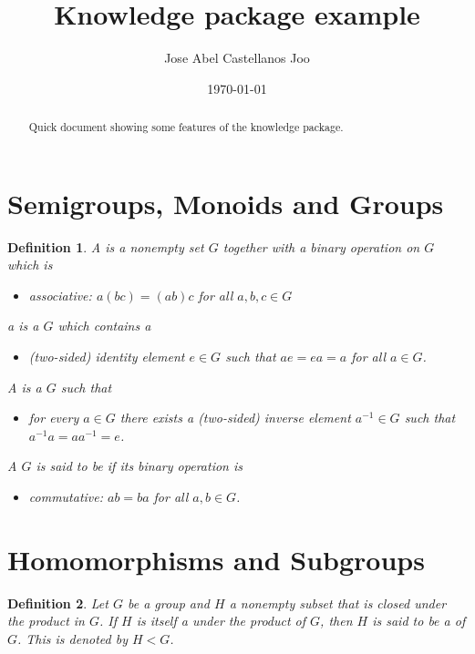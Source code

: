 \documentclass[a4paper]{article}
\title{Knowledge package example}
\author{Jose Abel Castellanos Joo}
\date{\today}
\newtheorem{definition}{Definition}[section]
\begin{document}
\maketitle

\begin{abstract}
  Quick document showing some features of the knowledge package.
\end{abstract}

\section{Semigroups, Monoids and Groups} \cite{Hungerford1980}

\begin{definition}
  A  is a nonempty set $G$ together
  with a binary operation on $G$ which is
  \begin{itemize}
    \item associative: $a(bc) = (ab)c$ for all $a, b, c \in G$
  \end{itemize}

  a  is a  $G$ which contains a 
  \begin{itemize}
    \item (two-sided) identity element $e \in G$ such that $ae = ea = a$ for all $a \in G$.
  \end{itemize}

  A  is a  $G$ such that

  \begin{itemize}
    \item for every $a \in G$ there exists a (two-sided) inverse element $a^{-1} \in G$
      such that $a^{-1}a = aa^{-1} = e$.
  \end{itemize}

  A  $G$ is said to be  if its binary operation is
  \begin{itemize}
    \item commutative: $ab = ba$ for all $a, b \in G$.
  \end{itemize}
\end{definition}

\section{Homomorphisms and Subgroups}

\begin{definition}
  Let $G$ be a group and $H$ a nonempty
  subset that is closed under the product in $G$.
  If $H$ is itself a  under the product
  of $G$, then $H$ is said to be a  
  of $G$. This is denoted by $H < G$.
\end{definition}
\end{document}
